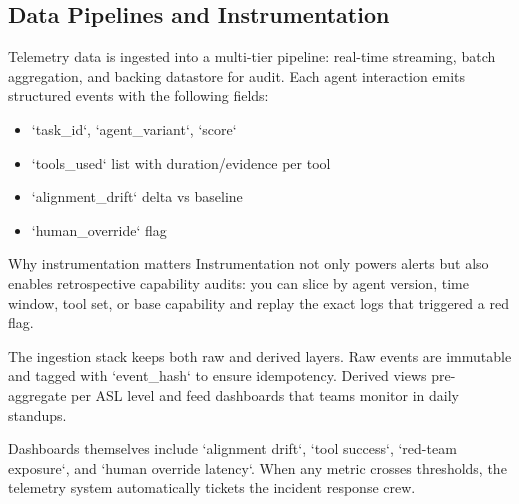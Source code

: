 \subsection{Data Pipelines and Instrumentation}

Telemetry data is ingested into a multi-tier pipeline: real-time streaming, batch aggregation, and backing datastore for audit. Each agent interaction emits structured events with the following fields:

\begin{itemize}
    \item `task\_id`, `agent\_variant`, `score`
    \item `tools\_used` list with duration/evidence per tool
    \item `alignment\_drift` delta vs baseline
    \item `human\_override` flag
\end{itemize}

\begin{importantbox}{Why instrumentation matters}
Instrumentation not only powers alerts but also enables retrospective capability audits: you can slice by agent version, time window, tool set, or base capability and replay the exact logs that triggered a red flag.
\end{importantbox}

The ingestion stack keeps both raw and derived layers. Raw events are immutable and tagged with `event\_hash` to ensure idempotency. Derived views pre-aggregate per ASL level and feed dashboards that teams monitor in daily standups.

Dashboards themselves include `alignment drift`, `tool success`, `red-team exposure`, and `human override latency`. When any metric crosses thresholds, the telemetry system automatically tickets the incident response crew.

